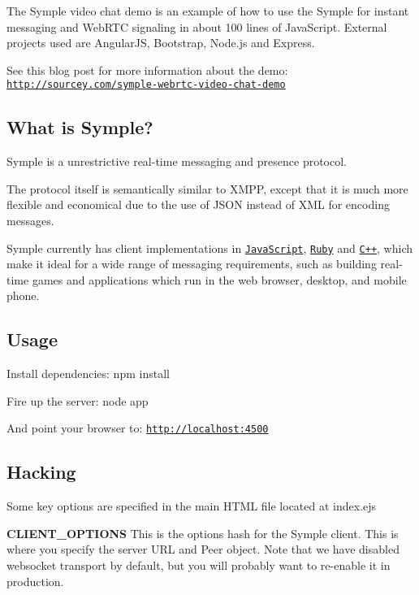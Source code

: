 The Symple video chat demo is an example of how to use the Symple for instant messaging and Web\+R\+TC signaling in about 100 lines of Java\+Script. External projects used are Angular\+JS, Bootstrap, Node.\+js and Express.

See this blog post for more information about the demo\+: \href{http://sourcey.com/symple-webrtc-video-chat-demo}{\tt http\+://sourcey.\+com/symple-\/webrtc-\/video-\/chat-\/demo}

\subsection*{What is Symple?}

Symple is a unrestrictive real-\/time messaging and presence protocol.

The protocol itself is semantically similar to X\+M\+PP, except that it is much more flexible and economical due to the use of J\+S\+ON instead of X\+ML for encoding messages.

Symple currently has client implementations in \href{https://github.com/sourcey/symple-client}{\tt Java\+Script}, \href{https://github.com/sourcey/symple-client-ruby}{\tt Ruby} and \href{https://github.com/sourcey/libsourcey/tree/master/src/symple}{\tt C++}, which make it ideal for a wide range of messaging requirements, such as building real-\/time games and applications which run in the web browser, desktop, and mobile phone.

\subsection*{Usage}


\begin{DoxyEnumerate}
\item Install dependencies\+: {\ttfamily npm install}
\item Fire up the server\+: {\ttfamily node app}
\item And point your browser to\+: {\ttfamily \href{http://localhost:4500}{\tt http\+://localhost\+:4500}}
\end{DoxyEnumerate}

\subsection*{Hacking}

Some key options are specified in the main H\+T\+ML file located at {\ttfamily index.\+ejs}

{\bfseries C\+L\+I\+E\+N\+T\+\_\+\+O\+P\+T\+I\+O\+NS} This is the options hash for the Symple client. This is where you specify the server U\+RL and Peer object. Note that we have disabled \textquotesingle{}websocket\textquotesingle{} transport by default, but you will probably want to re-\/enable it in production.

